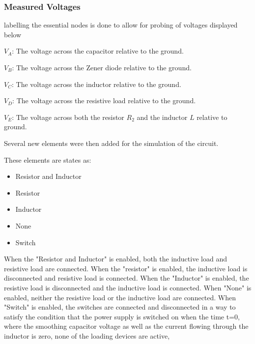 \subsubsection{Measured Voltages}

labelling the essential nodes is done to allow for probing of voltages displayed below

$V_A$: The voltage across the capacitor relative to the ground.

$V_B$: The voltage across the Zener diode relative to the ground.

$V_C$: The voltage across the inductor relative to the ground.

$V_D$: The voltage across the resistive load relative to the ground.

$V_E$: The voltage across both the resistor $R_2$ and the inductor $L$ relative to ground.

Several new elements were then added for the simulation of the circuit. 

These elements are states as: 
\begin{itemize}
    \item Resistor and Inductor
    \item Resistor
    \item Inductor
    \item None 
    \item Switch
\end{itemize}

When the "Resistor and Inductor" is enabled, both the inductive load and resistive load are connected. When the "resistor" is enabled, the inductive load is disconnected and resistive load is connected. When the "Inductor" is enabled, the resistive load is disconnected and the inductive load is connected. When "None" is enabled, neither the resistive load or the inductive load are connected. When "Switch" is enabled, the switches are connected and disconnected in a way to satisfy the condition that the power supply is switched on when the time t=0, where the smoothing capacitor voltage as well as the current flowing through the inductor is zero, none of the loading devices are active, 
